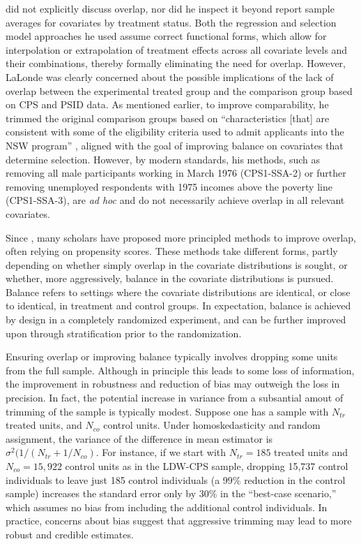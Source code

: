 \documentclass[letterpaper,12pt,leqno]{article}
\begin{document}
\citet{LaLonde} did not explicitly discuss overlap, nor did he inspect it beyond report sample averages for covariates by treatment status. Both the regression and selection model approaches he used assume correct functional forms, which allow for interpolation or extrapolation of treatment effects across all covariate levels and their combinations, thereby formally eliminating the need for overlap. 
However, LaLonde was clearly concerned about the possible implications of the lack of overlap between the experimental treated group and the comparison group based on CPS and PSID data. As mentioned earlier, to improve comparability, he trimmed the original comparison groups based on ``characteristics [that] are consistent with some of the eligibility criteria used to admit applicants into the NSW program'' \cite[p. 611]{LaLonde}, aligned with the goal of improving balance on covariates that determine selection. However, by modern standards, his methods, such as removing all male participants working in March 1976 (CPS1-SSA-2) or further removing unemployed respondents with 1975 incomes above the poverty line (CPS1-SSA-3), are {\it ad hoc} and do not necessarily achieve overlap in all relevant covariates. 

Since \citet{LaLonde}, many scholars have proposed more principled methods to improve overlap, often relying on propensity scores. 
These methods take different forms, partly depending on whether simply overlap in the covariate distributions is sought, or whether, more aggressively, balance in the covariate distributions is pursued. Balance refers to settings where the covariate distributions are identical, or close to identical, in treatment and control groups. In expectation, balance is achieved by design in a completely randomized experiment, and can be further improved upon through stratification prior to the randomization.

Ensuring overlap or improving balance typically involves dropping some units from the full sample. Although in principle this leads to some loss of information, the improvement in robustness and reduction of bias may outweigh the loss in precision. In fact, the potential increase in variance from a subsantial amout of  trimming of the sample is typically modest. Suppose one has a sample with $N_{tr}$ treated units, and $N_{co}$ control units. Under homoskedasticity and random assignment, the variance of the difference in mean estimator is $\sigma^2(1/(N_{tr}+1/N_{co})$. For instance, if we start with $N_{tr}=185$ treated units and $N_{co}=15,922$ control units as in the LDW-CPS sample, dropping 15,737 control individuals to leave just 185 control individuals (a 99\% reduction in the control sample) increases the standard error only by 30\% in the ``best-case scenario,'' which assumes no bias from including the additional control individuals. In practice, concerns about bias suggest that aggressive trimming may lead to more robust and credible estimates.
\end{document}
